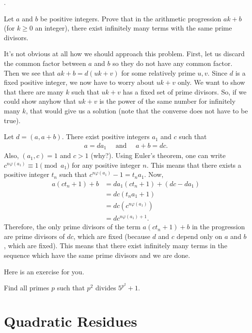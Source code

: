 \documentclass{subfile}
\begin{document}
	\textcite[Problem $68$]{WaclawSierpinski1964}.
		\begin{problem}
			Let $a$ and $b$ be positive integers. Prove that in the arithmetic progression $ak+b$ (for $k \geq 0$ an integer), there exist infinitely many terms with the same prime divisors.
		\end{problem}

		\begin{solution}
			It's not obvious at all how we should approach this problem. First, let us discard the common factor between $a$ and $b$ so they do not have any common factor. Then we see that $ak+b=d(uk+v)$ for some relatively prime $u,v$. Since $d$ is a fixed positive integer, we now have to worry about $uk+v$ only. We want to show that there are many $k$ such that $uk+v$ has a fixed set of prime divisors. So, if we could show anyhow that $uk+v$ is the power of the same number for infinitely many $k$, that would give us a solution (note that the converse does not have to be true).

			Let $d=(a, a+b)$. There exist positive integers $a_1$ and $c$ such that
				\begin{align*}
					a=da_1 \quad \text{ and } \quad a+b=dc.
				\end{align*}
			Also, $(a_1,c)=1$ and $c >1$ (why?). Using Euler's theorem, one can write $c^{n\varphi(a_1)} \equiv 1 \pmod {a_1}$ for any positive integer $n$. This means that there exists a positive integer $t_n$ such that $c^{n\varphi(a_1)}-1 = t_na_1$. Now,
				\begin{align*}
					a(ct_n+1) + b &= da_1(ct_n+1) + (dc-da_1)\\
								  &= dc(t_na_1 + 1)\\
								  &= dc \left(c^{n\varphi(a_1)}\right)\\
								  &= dc^{n\varphi(a_1)+1}.
				\end{align*}
			Therefore, the only prime divisors of the term $a(ct_n+1) + b$ in the progression are prime divisors of $dc$, which are fixed (because $d$ and $c$ depend only on $a$ and $b$, which are fixed). This means that there exist infinitely many terms in the sequence which have the same prime divisors and we are done.
		\end{solution}
	Here is an exercise for you.
		\begin{problem}
			Find all primes $p$ such that $p^2$ divides $5^{p^2}+1$.
		\end{problem}


	\section{Quadratic Residues}\label{sec:qr}
		
\end{document}
